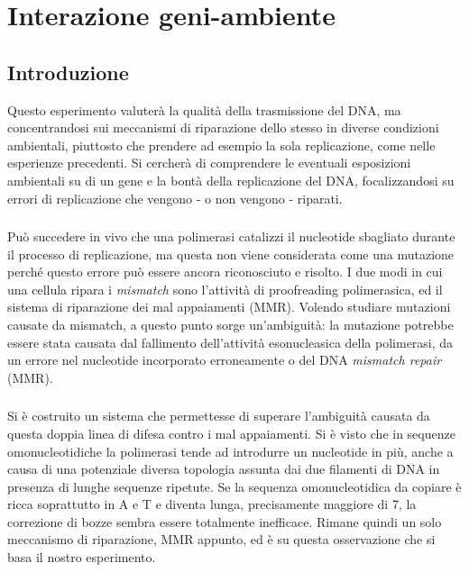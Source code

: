\section*{Interazione geni-ambiente}
 \subsection*{Introduzione}
 Questo esperimento valuterà la qualità della trasmissione del DNA, ma concentrandosi sui meccanismi di riparazione dello stesso in diverse condizioni ambientali, piuttosto che prendere ad esempio la sola replicazione, come nelle esperienze precedenti. Si cercherà di comprendere le eventuali esposizioni ambientali su di un gene e la bontà della replicazione del DNA, focalizzandosi su errori di replicazione che vengono - o non vengono - riparati. 
 
 \subsubsection*{}
 Può succedere in vivo che una polimerasi catalizzi il nucleotide sbagliato durante il processo di replicazione, ma questa non viene considerata come una mutazione perché questo errore può essere ancora riconosciuto e risolto. I due modi in cui una cellula ripara i \textit{mismatch} sono l'attività di proofreading polimerasica, ed il sistema di riparazione dei mal appaiamenti (MMR). Volendo studiare mutazioni causate da mismatch, a questo punto sorge un'ambiguità: la mutazione potrebbe essere stata causata dal fallimento dell'attività esonucleasica della polimerasi, da un errore nel nucleotide incorporato erroneamente o del DNA \textit{mismatch repair} (MMR). 
 
 \subsubsection*{}
 Si è costruito un sistema che permettesse di superare l'ambiguità causata da questa doppia linea di difesa contro i mal appaiamenti. Si è visto che in sequenze omonucleotidiche la polimerasi tende ad introdurre un nucleotide in più, anche a causa di una potenziale diversa topologia assunta dai due filamenti di DNA in presenza di lunghe sequenze ripetute. Se la sequenza omonucleotidica da copiare è ricca soprattutto in A e T e diventa lunga, precisamente maggiore di 7, la correzione di bozze sembra essere totalmente inefficace. Rimane quindi un solo meccanismo di riparazione, MMR appunto, ed è su questa osservazione che si basa il nostro esperimento. 
 

